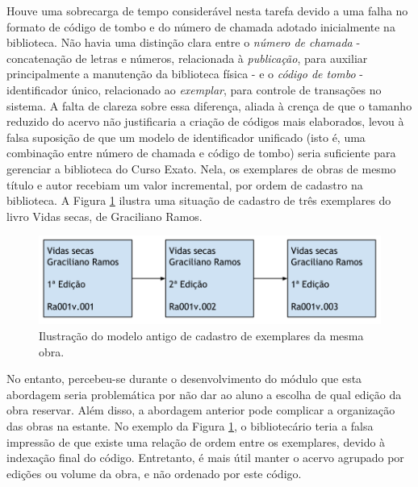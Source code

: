 \documentclass[a4paper]{article}
\begin{document}
Houve uma sobrecarga de tempo considerável nesta tarefa devido a uma falha no formato de código de tombo e do número de chamada adotado inicialmente na biblioteca. Não havia uma distinção clara entre o \textit{número de chamada} - concatenação de letras e números, relacionada à \textit{publicação}, para auxiliar principalmente a manutenção da biblioteca física - e o \textit{código de tombo} - identificador único, relacionado ao \textit{exemplar}, para controle de transações no sistema. A falta de clareza sobre essa diferença, aliada à crença de que o tamanho reduzido do acervo não justificaria a criação de códigos mais elaborados, levou à falsa suposição de que um modelo de identificador unificado (isto é, uma combinação entre número de chamada e código de tombo) seria suficiente para gerenciar a biblioteca do Curso Exato. Nela, os exemplares de obras de mesmo título e autor recebiam um valor incremental, por ordem de cadastro na biblioteca. A Figura \ref{tombo-antigo} ilustra uma situação de cadastro de três exemplares do livro Vidas secas, de Graciliano Ramos.

\begin{figure}[pbth!]
\centering
\includegraphics[width=120mm]{img/tombo-antigo.png}
\caption{Ilustração do modelo antigo de cadastro de exemplares da mesma obra.\label{tombo-antigo}}
\end{figure}

No entanto, percebeu-se durante o desenvolvimento do módulo que esta abordagem seria problemática por não dar ao aluno a escolha de qual edição da obra reservar. Além disso, a abordagem anterior pode complicar a organização das obras na estante. No exemplo da Figura \ref{tombo-antigo}, o bibliotecário teria a falsa impressão de que existe uma relação de ordem entre os exemplares, devido à indexação final do código. Entretanto, é mais útil manter o acervo agrupado por edições ou volume da obra, e não ordenado por este código.
\end{document}
